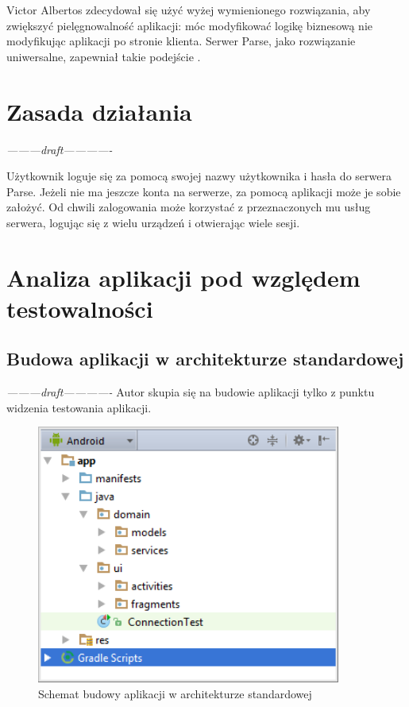 Victor Albertos zdecydował się użyć wyżej wymienionego rozwiązania, aby zwiększyć pielęgnowalność aplikacji: móc modyfikować logikę biznesową nie modyfikując aplikacji po stronie klienta. Serwer Parse, jako rozwiązanie uniwersalne, zapewniał takie podejście \cite{website:victor:application}.

\section{Zasada działania}
\textit{---------draft-------------}

Użytkownik loguje się za pomocą swojej nazwy użytkownika i hasła do serwera Parse. Jeżeli nie ma jeszcze konta na serwerze, za pomocą aplikacji może je sobie założyć. Od chwili zalogowania może korzystać z przeznaczonych mu usług serwera, logując się z wielu urządzeń i otwierając wiele sesji.

\section{Analiza aplikacji pod względem testowalności}

\subsection{Budowa aplikacji w architekturze standardowej}
\textit{---------draft-------------}
Autor skupia się na budowie aplikacji tylko z punktu widzenia testowania aplikacji.

\begin{figure}[!htb]
    \centering
    \includegraphics[width=10cm]{imgs/ch6_app_st.png}
    \caption
{Schemat budowy aplikacji w architekturze standardowej}
    \label{fig:app_std}
\end{figure} 


